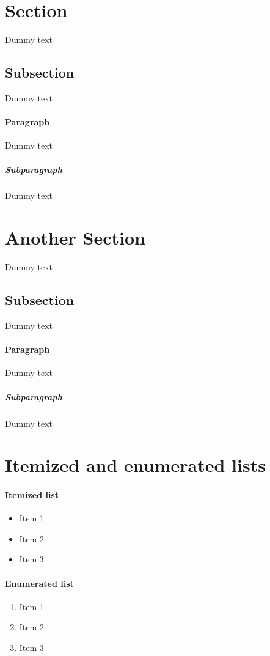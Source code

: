 \documentclass{article}
\begin{document}
\tableofcontents
\newpage

\section{Section}
Dummy text
\subsection{Subsection}
Dummy text
\paragraph{Paragraph}
Dummy text
\subparagraph{Subparagraph}
Dummy text

\section{Another Section}
Dummy text
\subsection{Subsection}
Dummy text
\paragraph{Paragraph}
Dummy text
\subparagraph{Subparagraph}
Dummy text

\section{Itemized and enumerated lists}
\paragraph{Itemized list}
\begin{itemize}
\item Item 1
\item Item 2
\item Item 3
\end{itemize}
\paragraph{Enumerated list}
\begin{enumerate}
\item Item 1
\item Item 2
\item Item 3
\end{enumerate}
\end{document}
